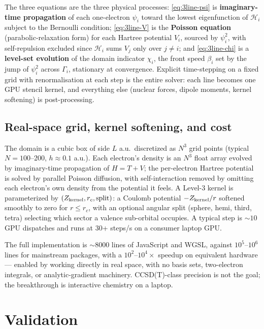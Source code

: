 \documentclass[11pt]{article}
\begin{document}
The three equations are the three physical processes: \eqref{eq:3line-psi} is \textbf{imaginary-time propagation} of each one-electron $\psi_i$ toward the lowest eigenfunction of $\mathcal{H}_i$ subject to the Bernoulli condition; \eqref{eq:3line-V} is the \textbf{Poisson equation} (parabolic-relaxation form) for each Hartree potential $V_i$, sourced by $\psi_i^2$, with self-repulsion excluded since $\mathcal{H}_i$ sums $V_j$ only over $j\ne i$; and \eqref{eq:3line-chi} is a \textbf{level-set evolution} of the domain indicator $\chi_i$, the front speed $\beta_i$ set by the jump of $\psi_i^2$ across $\Gamma_i$, stationary at convergence. Explicit time-stepping on a fixed grid with renormalisation at each step is the entire solver: each line becomes one GPU stencil kernel, and everything else (nuclear forces, dipole moments, kernel softening) is post-processing.

\subsection{Real-space grid, kernel softening, and cost}

The domain is a cubic box of side $L$ a.u.\ discretized as $N^3$ grid points (typical $N=100$--200, $h \approx 0.1$ a.u.). Each electron's density is an $N^3$ float array evolved by imaginary-time propagation of $H = T + V$; the per-electron Hartree potential is solved by parallel Poisson diffusion, with self-interaction removed by omitting each electron's own density from the potential it feels. A Level-3 kernel is parameterized by $(Z_{\rm kernel}, r_c, \text{split})$: a Coulomb potential $-Z_{\rm kernel}/r$ softened smoothly to zero for $r \le r_c$, with an optional angular split (sphere, hemi, third, tetra) selecting which sector a valence sub-orbital occupies. A typical step is ${\sim}10$ GPU dispatches and runs at 30+ steps/s on a consumer laptop GPU.

The full implementation is $\sim$8000 lines of JavaScript and WGSL, against $10^5$--$10^6$ lines for mainstream packages, with a $10^2$--$10^4\times$ speedup on equivalent hardware --- enabled by working directly in real space, with no basis sets, two-electron integrals, or analytic-gradient machinery. CCSD(T)-class precision is not the goal; the breakthrough is interactive chemistry on a laptop.

\section{Validation}\label{sec:validation}
\end{document}
